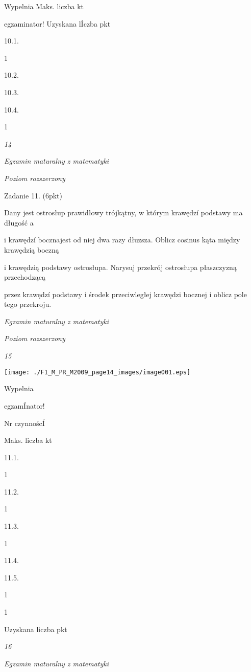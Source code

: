 \documentclass[a4paper,12pt]{article}
\begin{document}
Wypelnia Maks. liczba kt

egzaminator! Uzyskana lÍczba pkt

10.1.

1

10.2.

10.3.

10.4.

1





{\it 14}

{\it Egzamin maturalny z matematyki}

{\it Poziom rozszerzony}

Zadanie 11. (6pkt)

Dany jest ostrosłup prawidłowy trójkątny, w którym krawędzí podstawy ma długość a

i krawędzí bocznajest od niej dwa razy dłuzsza. Oblicz cosinus kąta między krawędzią boczną

i krawędzią podstawy ostrosłupa. Narysuj przekrój ostrosłupa płaszczyzną przechodzącą

przez krawędzí podstawy i środek przeciwległej krawędzi bocznej i oblicz pole tego przekroju.





{\it Egzamin maturalny z matematyki}

{\it Poziom rozszerzony}

{\it 15}
\begin{center}
\texttt{[image: ./F1\_M\_PR\_M2009\_page14\_images/image001.eps]}
\end{center}
Wypelnia

egzamÍnator!

Nr czynnoścÍ

Maks. liczba kt

11.1.

1

11.2.

1

11.3.

1

11.4.

11.5.

1

1

Uzyskana liczba pkt





{\it 16}

{\it Egzamin maturalny z matematyki}
\end{document}
